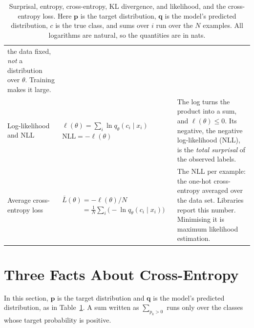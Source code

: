 \documentclass[12pt]{article}
\numberwithin{equation}{section} %
\newcommand{\lnThree}{1.0986}
\newcommand{\pTrue}{0.3158}
\newcommand{\vc}[1]{\symbf{#1}}
\begin{document}
\begin{table}[htbp]
\begin{tabular}{@{}>{\raggedright\arraybackslash}p{2.5cm}>{\raggedright\arraybackslash}p{5.4cm}>{\raggedright\arraybackslash}p{6.8cm}@{}}
        the data fixed, \emph{not} a distribution over $\theta$.
        Training makes it large. \\[5pt]
    Log-likelihood and NLL
      & $\ell(\theta) = \sum_{i} \ln q_\theta(c_i \mid x_i)$ \newline
        $\text{NLL} = -\ell(\theta)$
      & The log turns the product into a sum, and
        $\ell(\theta) \le 0$. Its negative, the negative
        log-likelihood (NLL), is the \emph{total surprisal} of the
        observed labels. \\[5pt]
    Average cross-entropy loss
      & $\bar{L}(\theta) = -\ell(\theta)/N$ \newline
        $\phantom{\bar{L}(\theta)} = \tfrac{1}{N}\sum_{i} \big(-\ln q_\theta(c_i \mid x_i)\big)$
      & The NLL per example: the one-hot cross-entropy averaged over
        the data set. Libraries report this number. Minimising it is
        maximum likelihood estimation. \\
    \bottomrule
  \end{tabular}
  \caption{Surprisal, entropy, cross-entropy, KL divergence,
  and likelihood, and the cross-entropy loss. Here $\vc{p}$ is the target
  distribution, $\vc{q}$ is the model's predicted distribution,
  $c$ is the true class, and sums over $i$ run over the $N$
  examples. All logarithms are natural, so the quantities are in
  nats.}
  \label{tab:info}
\end{table}

\newpage

\section{Three Facts About Cross-Entropy}

In this section, $\vc{p}$ is the target distribution and $\vc{q}$ is
the model's predicted distribution, as in Table~\ref{tab:info}. A sum
written as $\sum_{p_k>0}$ runs only over the classes whose target
probability is positive.
\end{document}
